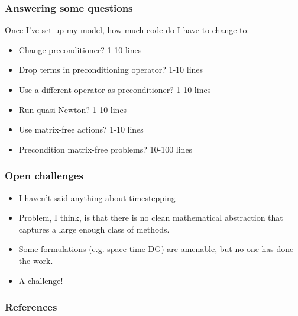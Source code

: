 \documentclass[presentation]{beamer}
\begin{document}
\begin{frame}
  \frametitle{Answering some questions}
  Once I've set up my model, how much code do I have to change to:

  \begin{itemize}
  \item Change preconditioner? 1-10 lines
  \item Drop terms in preconditioning operator? 1-10 lines
  \item Use a different operator as preconditioner? 1-10 lines
  \item Run quasi-Newton? 1-10 lines
  \item Use matrix-free actions? 1-10 lines
  \item Precondition matrix-free problems? 10-100 lines
  \end{itemize}
\end{frame}

\begin{frame}
  \frametitle{Open challenges}
  \begin{itemize}
  \item I haven't said anything about timestepping

  \item Problem, I think, is that there is no clean mathematical
    abstraction that captures a large enough class of methods.

  \item Some formulations (e.g. space-time DG) are amenable, but
    no-one has done the work.
    
  \item A challenge!
  \end{itemize}
\end{frame}


\appendix
\begin{frame}[t,allowframebreaks]
  \frametitle{References}
  \printbibliography[heading=none]
\end{frame}
\end{document}
